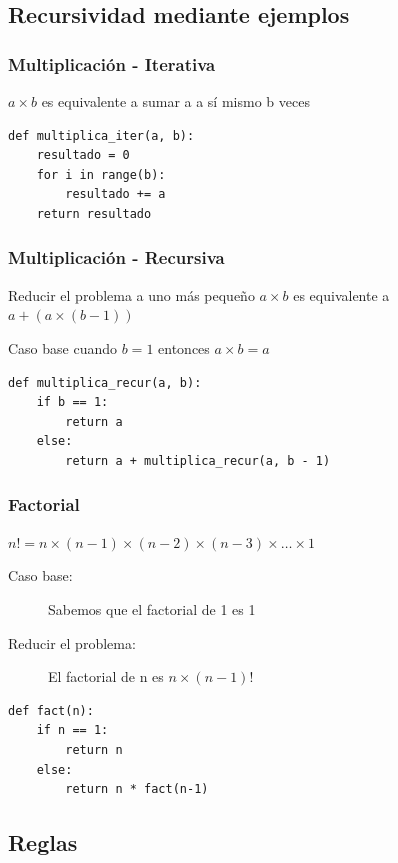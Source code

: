 \documentclass[11pt]{beamer}
\begin{document}
	\subsection{Recursividad mediante ejemplos}

	\begin{frame}[fragile]\frametitle{Multiplicación - Iterativa}
	\begin{block}{}
	\centering $a \times b$ es equivalente a sumar a a sí mismo b veces
	\end{block}
	\begin{lstlisting}
def multiplica_iter(a, b):
	resultado = 0
	for i in range(b):
		resultado += a
	return resultado
\end{lstlisting}
	\end{frame}

	\begin{frame}[fragile]\frametitle{Multiplicación - Recursiva}
	\begin{block}{Reducir el problema a uno más pequeño}
	\centering $a \times b$ es equivalente a $a + (a  \times (b - 1))$
	\end{block}
	\begin{block}{Caso base}
	\centering cuando $b = 1$ entonces $a \times b = a$
	\end{block}
	\pause
	\begin{lstlisting}
def multiplica_recur(a, b):
	if b == 1:
		return a
	else:
		return a + multiplica_recur(a, b - 1)
\end{lstlisting}
	\end{frame}

	\begin{frame}[fragile]\frametitle{Factorial}
	\begin{block}{}
	\centering $n! = n \times (n - 1) \times (n - 2) \times (n - 3) \times \ldots \times 1$
	\end{block}
	\begin{description}
	\item[Caso base:] Sabemos que el factorial de 1 es 1
	\item[Reducir el problema:] El factorial de n es $n \times (n - 1)!$
	\end{description}
	\pause
	\begin{lstlisting}
def fact(n):
	if n == 1:
		return n
	else:
		return n * fact(n-1)
\end{lstlisting}
	\end{frame}

	\subsection{Reglas}
\end{document}
